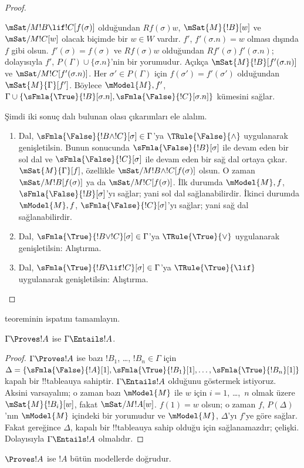 \documentclass[../../../include/open-logic-section]{subfiles}
\begin{document}
\begin{proof}
\begin{enumerate}
  $\mSat/{M}{!B \lif !C}[f(\sigma)]$ olduğundan $Rf(\sigma)w$,
  $\mSat{M}{!B}[w]$ ve $\mSat/{M}{!C}[w]$ olacak biçimde bir $w \in W$
  vardır. $f'$, $f'(\sigma.n)=w$ olması dışında $f$ gibi olsun.
  $f'(\sigma)=f(\sigma)$ ve $Rf(\sigma)w$ olduğundan
  $Rf'(\sigma)f'(\sigma.n)$; dolayısıyla $f'$,
  $P(\Gamma) \cup \{\sigma.n\}$'nin bir yorumudur. Açıkça
  $\mSat{M}{!B}[f'(\sigma.n)]$ ve $\mSat/{M}{!C}[f'(\sigma.n)]$.
  Her $\sigma' \in P(\Gamma)$ için $f(\sigma')=f'(\sigma')$ olduğundan
  $\mSat{M}{\Gamma}[f']$. Böylece $\mModel{M},f'$,
  $\Gamma \cup \{\sFmla{\True}{!B}[\sigma.n],
  \sFmla{\False}{!C}[\sigma.n]\}$ kümesini sağlar.
\end{enumerate}
Şimdi iki sonuç dalı bulunan olası çıkarımları ele alalım.
\begin{enumerate}
\item Dal, $\sFmla{\False}{!B \land !C}[\sigma] \in \Gamma$'ya
  $\TRule{\False}{\land}$ uygulanarak genişletilsin. Bunun sonucunda
  $\sFmla{\False}{!B}[\sigma]$ ile devam eden bir sol dal ve
  $\sFmla{\False}{!C}[\sigma]$ ile devam eden bir sağ dal ortaya çıkar.
  $\mSat{M}{\Gamma}[f]$, özellikle
  $\mSat/{M}{!B \land !C}[f(\sigma)]$ olsun. O zaman
  $\mSat/{M}{!B}[f(\sigma)]$ ya da $\mSat/{M}{!C}[f(\sigma)]$. İlk durumda
  $\mModel{M},f$, $\sFmla{\False}{!B}[\sigma]$'yı sağlar; yani sol dal
  sağlanabilirdir. İkinci durumda $\mModel{M},f$,
  $\sFmla{\False}{!C}[\sigma]$'yı sağlar; yani sağ dal sağlanabilirdir.
\item Dal, $\sFmla{\True}{!B \lor !C}[\sigma] \in \Gamma$'ya
    $\TRule{\True}{\lor}$ uygulanarak genişletilsin: Alıştırma.
\item Dal, $\sFmla{\True}{!B \lif !C}[\sigma] \in \Gamma$'ya
    $\TRule{\True}{\lif}$ uygulanarak genişletilsin: Alıştırma.
\end{enumerate}
\end{proof}

\begin{prob}
 teoreminin ispatını tamamlayın.
\end{prob}

\begin{cor}
$\Gamma \Proves !A$ ise $\Gamma \Entails !A$.
\end{cor}

\begin{proof}
  $\Gamma \Proves !A$ ise bazı $!B_1$, \dots, $!B_n \in \Gamma$ için
  $\Delta = \{\sFmla{\False}{!A}[1], \sFmla{\True}{!B_1}[1],
  \dots, \sFmla{\True}{!B_n}[1]\}$ kapalı bir !!{tableau}{}ya sahiptir.
  $\Gamma \Entails !A$ olduğunu göstermek istiyoruz. Aksini varsayalım; o
  zaman bazı $\mModel{M}$ ile $w$ için $i=1$, \dots,~$n$ olmak üzere
  $\mSat{M}{!B_i}[w]$, fakat $\mSat/{M}{!A}[w]$. $f(1)=w$ olsun; o zaman
  $f$, $P(\Delta)$'nın $\mModel{M}$ içindeki bir yorumudur ve $\mModel{M}$,
  $\Delta$'yı $f$'ye göre sağlar. Fakat 
  gereğince $\Delta$, kapalı bir !!{tableau}{}ya sahip olduğu için sağlanamazdır;
  çelişki. Dolayısıyla $\Gamma \Entails !A$ olmalıdır.
\end{proof}

\begin{cor}
$\Proves !A$ ise $!A$ bütün modellerde doğrudur.
\end{cor}
\end{document}
